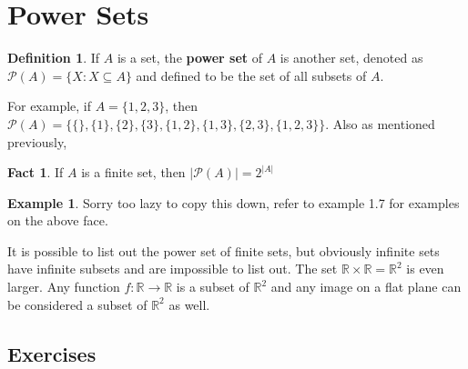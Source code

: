 \documentclass[10pt]{article}
\newcommand{\R}{\mathbb{R}}
\theoremstyle{definition}
\newtheorem{example}{Example}
\newtheorem{definition}{Definition}
\newtheorem{fact}{Fact}
\begin{document}
    \section{Power Sets}
    \begin{definition}
        If $A$ is a set, the \textbf{power set} of $A$ is another set, denoted as $\mathscr{P}(A) = \{X: X \subseteq A\}$ and defined to be the set of all subsets of $A$.
    \end{definition}

    For example, if $A = \{1,2,3\}$, then $\mathscr{P}(A) =\{\{\},\{1\},\{2\},\{3\},\{1,2\},\{1,3\},\{2,3\},\{1,2,3\}\}$. Also as mentioned previously,

    \begin{fact}
        If $A$ is a finite set, then $|\mathscr{P}(A)| = 2^{|A|}$
    \end{fact}

    \begin{example}
        Sorry too lazy to copy this down, refer to example 1.7 for examples on the above face.
    \end{example}

    It is possible to list out the power set of finite sets, but obviously infinite sets have infinite subsets and are impossible to list out. The set $\R\times\R=\R^2$ is even larger. Any function $f:\R\rightarrow\R$ is a subset of $\R^2$ and any image on a flat plane can be considered a subset of $\R^2$ as well.

    \subsection*{Exercises}
\end{document}
